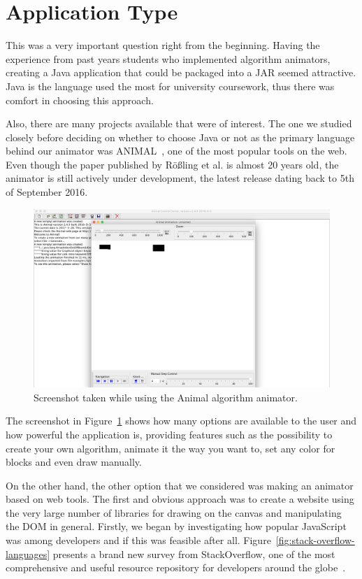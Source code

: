 \documentclass{l4proj}
\begin{document}
\section{Application Type}

This was a very important question right from the beginning. Having the experience from past years students who
implemented algorithm animators, creating a Java application that could be packaged into a JAR seemed attractive. Java is the
language used the most for university coursework, thus there was comfort in choosing this approach.

Also, there are many projects available that were of interest. The one we studied closely before deciding on whether to
choose Java or not as the primary language behind our animator was ANIMAL~\cite{animal-algo-animation}, one of the most popular tools on the
web. Even though the paper published by Rößling et al. is almost 20 years old, the animator is still actively under
development, the latest release dating back to 5th of September 2016.

\begin{figure}[!ht]
    \centering
    \includegraphics[scale=0.25]{animal-algo-animator}
    \caption{Screenshot taken while using the Animal algorithm animator.}
    \label{fig:animal-algo-animator}
\end{figure}

The screenshot in Figure~\ref{fig:animal-algo-animator} shows how many options are available to the user and how powerful the application is, providing
features such as the possibility to create
your own algorithm, animate it the way you want to, set any color for blocks and even draw manually.

On the other hand, the other option that we considered was making an animator based on web tools. The first and obvious
approach was to create a website using the very large number of libraries for drawing on the canvas and manipulating
the DOM in general. Firstly, we began by investigating how popular JavaScript was among developers and if this was
feasible after all. Figure~\ref{fig:stack-overflow-languages} presents a brand new survey from StackOverflow, one of the most comprehensive and useful resource repository for developers around
the globe~\cite{stackoverflow-survey}.
\end{document}
